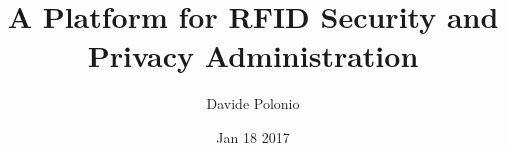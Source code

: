 \documentclass{beamer}
\title{A Platform for RFID Security and Privacy Administration}
\author{Davide Polonio}
\date{Jan 18 2017}
\institute{University of Padova}
\begin{document}
\graphicspath{{res/image/}}


\end{document}
